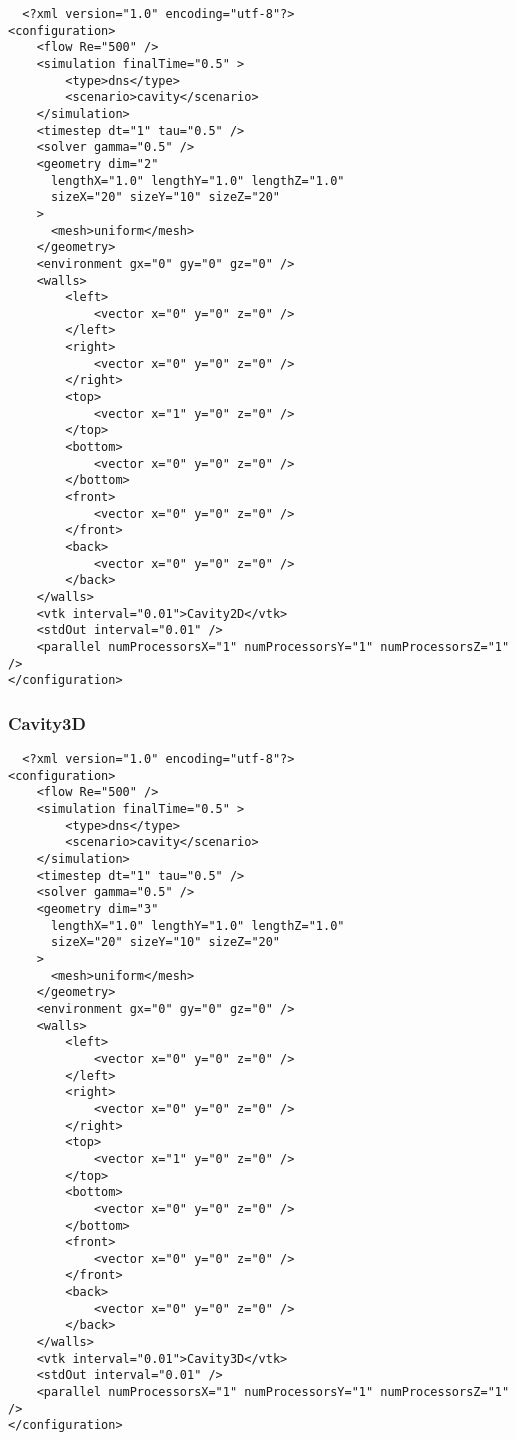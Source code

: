 \documentclass[
  english,        %
  font=palatino,     %
  onecolumn,      %
]{tumarticle}
\begin{document}
\begin{verbatim}
  <?xml version="1.0" encoding="utf-8"?>
<configuration>
    <flow Re="500" />
    <simulation finalTime="0.5" >
        <type>dns</type>
        <scenario>cavity</scenario>
    </simulation>
    <timestep dt="1" tau="0.5" />
    <solver gamma="0.5" />
    <geometry dim="2"
      lengthX="1.0" lengthY="1.0" lengthZ="1.0"
      sizeX="20" sizeY="10" sizeZ="20"
    >
      <mesh>uniform</mesh>
    </geometry>
    <environment gx="0" gy="0" gz="0" />
    <walls>
        <left>
            <vector x="0" y="0" z="0" />
        </left>
        <right>
            <vector x="0" y="0" z="0" />
        </right>
        <top>
            <vector x="1" y="0" z="0" />
        </top>
        <bottom>
            <vector x="0" y="0" z="0" />
        </bottom>
        <front>
            <vector x="0" y="0" z="0" />
        </front>
        <back>
            <vector x="0" y="0" z="0" />
        </back>
    </walls>
    <vtk interval="0.01">Cavity2D</vtk>
    <stdOut interval="0.01" />
    <parallel numProcessorsX="1" numProcessorsY="1" numProcessorsZ="1" />
</configuration>
\end{verbatim}

\subsubsection*{Cavity3D}

\begin{verbatim}
  <?xml version="1.0" encoding="utf-8"?>
<configuration>
    <flow Re="500" />
    <simulation finalTime="0.5" >
        <type>dns</type>
        <scenario>cavity</scenario>
    </simulation>
    <timestep dt="1" tau="0.5" />
    <solver gamma="0.5" />
    <geometry dim="3"
      lengthX="1.0" lengthY="1.0" lengthZ="1.0"
      sizeX="20" sizeY="10" sizeZ="20"
    >
      <mesh>uniform</mesh>
    </geometry>
    <environment gx="0" gy="0" gz="0" />
    <walls>
        <left>
            <vector x="0" y="0" z="0" />
        </left>
        <right>
            <vector x="0" y="0" z="0" />
        </right>
        <top>
            <vector x="1" y="0" z="0" />
        </top>
        <bottom>
            <vector x="0" y="0" z="0" />
        </bottom>
        <front>
            <vector x="0" y="0" z="0" />
        </front>
        <back>
            <vector x="0" y="0" z="0" />
        </back>
    </walls>
    <vtk interval="0.01">Cavity3D</vtk>
    <stdOut interval="0.01" />
    <parallel numProcessorsX="1" numProcessorsY="1" numProcessorsZ="1" />
</configuration>

\end{verbatim}
\end{document}
